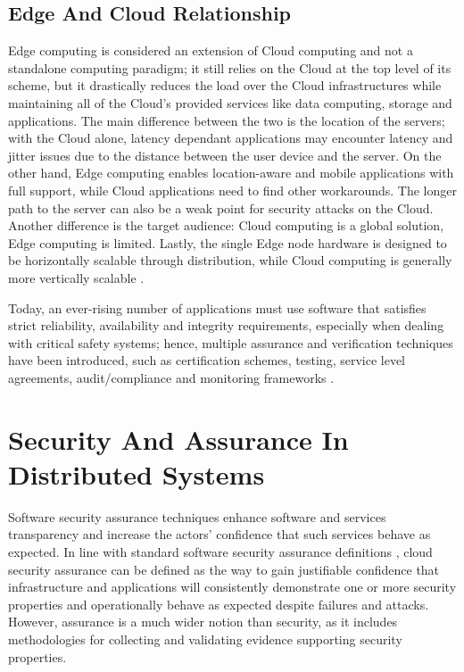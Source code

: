 \subsection{Edge And Cloud Relationship}
Edge computing is considered an extension of Cloud computing and not a standalone computing paradigm; it still relies on the Cloud at the top level of its scheme, but it drastically reduces the load over the Cloud infrastructures while maintaining all of the Cloud's provided services like data computing, storage and applications. The main difference between the two is the location of the servers; with the Cloud alone, latency dependant applications may encounter latency and jitter issues due to the distance between the user device and the server. On the other hand, Edge computing enables location-aware and mobile applications with full support, while Cloud applications need to find other workarounds. The longer path to the server can also be a weak point for security attacks on the Cloud. Another difference is the target audience: Cloud computing is a global solution, Edge computing is limited. Lastly, the single Edge node hardware is designed to be horizontally scalable through distribution, while Cloud computing is generally more vertically scalable \cite{khan2019edge}.


Today, an ever-rising number of applications must use software that satisfies strict reliability, availability and integrity requirements, especially when dealing with critical safety systems; hence, multiple assurance and verification techniques have been introduced, such as certification schemes, testing, service level agreements, audit/compliance and monitoring frameworks \cite{ardagna2015security}. 


\section{Security And Assurance In Distributed Systems}
Software security assurance techniques enhance software and services transparency \cite{ardagna2014management} and increase the actors' confidence that such services behave as expected. In line with standard software security assurance definitions \cite{goertzel2007software}, cloud security assurance can be defined as the way to gain justifiable confidence that infrastructure and applications will consistently demonstrate one or more security properties and operationally behave as expected despite failures and attacks. However, assurance is a much wider notion than security, as it includes methodologies for collecting and validating evidence supporting security properties.

